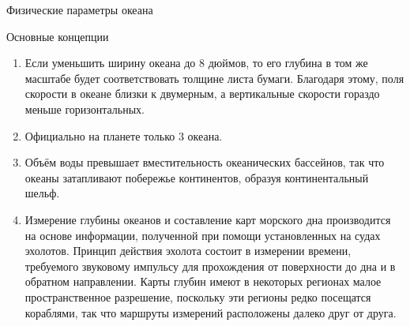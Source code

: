 \begin{chapter}{Физические параметры океана}
\begin{section}{Основные концепции}
\begin{enumerate}
\item
Если уменьшить ширину океана до 8 дюймов, то его глубина в том же масштабе
будет соответствовать толщине листа бумаги. Благодаря этому, поля скорости 
в океане близки к двумерным, а вертикальные скорости гораздо меньше
горизонтальных.
%


\item
Официально на планете только 3 океана.
%

\item
Объём воды превышает вместительность океанических бассейнов, так что океаны
затапливают побережье континентов, образуя континентальный шельф.
%

\item
Измерение глубины океанов и составление карт морского дна производится на 
основе информации, полученной при помощи установленных на судах эхолотов.
Принцип действия эхолота состоит в измерении времени, требуемого звуковому
импульсу для прохождения от поверхности до дна и в обратном направлении.
Карты глубин имеют в некоторых регионах малое пространственное разрешение,
поскольку эти регионы редко посещатся кораблями, так что маршруты измерений
расположены далеко друг от друга.
%


\end{enumerate}
\end{section}
\end{chapter}
